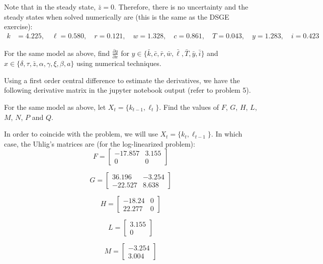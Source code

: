 \documentclass[letterpaper,11pt]{article}
\theoremstyle{definition}
\begin{document}
\begin{spacing}{1.5}
	Note that in the steady state, $\bar{z} = 0$. Therefore, there is no uncertainty and the steady states when solved numerically are (this is the same as the DSGE exercise):
	\begin{align*}
		k&=4.225, \quad \ell= 0.580, \quad r= 0.121, \quad w=1.328, \quad c=0.861, \quad T=0.043, \quad y=1.283, \quad i=0.423
	\end{align*}

	\begin{Exercise} \label{Linear_HW_Base_Numer_Deriv}
		For the same model as above, find $\frac{\partial y}{\partial x}$ for $y\in\{\bar k, \bar c, \bar r, \bar w, \bar \ell, \bar T, \bar y, \bar i\}$ and $x\in\{\delta, \tau, \bar z, \alpha, \gamma, \xi, \beta, a \}$ using numerical techniques.
	\end{Exercise}

	Using a first order central difference to estimate the derivatives, we have the following derivative matrix in the jupyter notebook output (refer to problem 5).

	\begin{Exercise} \label{Linear_HW_Base_Coeffs}
		For the same model as above, let $X_t = \{k_{t-1}, \ell_t\}$.  Find the values of $F$, $G$, $H$, $L$, $M$, $N$, $P$ and $Q$.
	\end{Exercise}

	In order to coincide with the problem, we will use  $X_t = \{k_t,\ell_{t-1}\}$. In which case, the Uhlig's matrices are (for the log-linearized problem):
	\[
		F =
		\begin{bmatrix}
			-17.857 & 3.155\\
			0 & 0
		\end{bmatrix}
	\]

	\[
		G =
		\begin{bmatrix}
			36.196 & -3.254\\
			-22.527 & 8.638
		\end{bmatrix}
	\]

	\[
		H =
		\begin{bmatrix}
			-18.24 & 0 \\
			22.277 & 0
		\end{bmatrix}
	\]

	\[
		L =
		\begin{bmatrix}
			3.155 \\
			0
		\end{bmatrix}
	\]

	\[
		M =
		\begin{bmatrix}
			-3.254 \\
			3.004
		\end{bmatrix}
	\]


\end{spacing}
\end{document}
